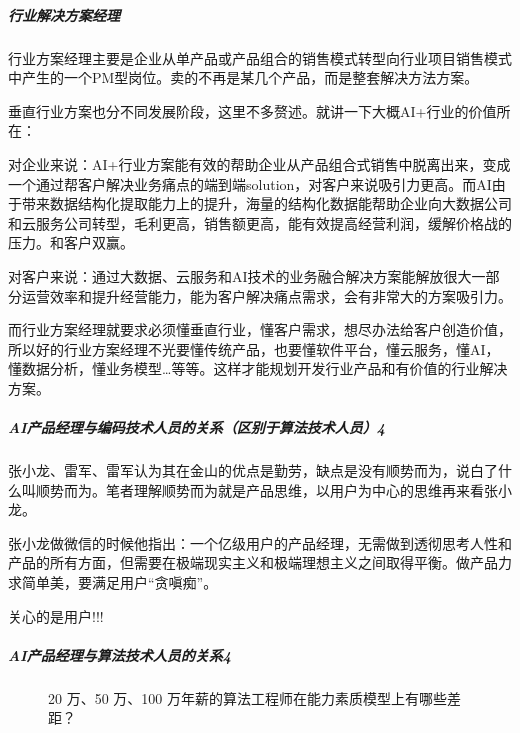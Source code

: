 \documentclass[letterpaper,10pt,english]{sphinxmanual}
\begin{document}
\subparagraph{行业解决方案经理}
\label{\detokenize{chapter_introduction/AI_PM:id16}}
行业方案经理主要是企业从单产品或产品组合的销售模式转型向行业项目销售模式中产生的一个PM型岗位。卖的不再是某几个产品，而是整套解决方法方案。

垂直行业方案也分不同发展阶段，这里不多赘述。就讲一下大概AI+行业的价值所在：

对企业来说：AI+行业方案能有效的帮助企业从产品组合式销售中脱离出来，变成一个通过帮客户解决业务痛点的端到端solution，对客户来说吸引力更高。而AI由于带来数据结构化提取能力上的提升，海量的结构化数据能帮助企业向大数据公司和云服务公司转型，毛利更高，销售额更高，能有效提高经营利润，缓解价格战的压力。和客户双赢。

对客户来说：通过大数据、云服务和AI技术的业务融合解决方案能解放很大一部分运营效率和提升经营能力，能为客户解决痛点需求，会有非常大的方案吸引力。

而行业方案经理就要求必须懂垂直行业，懂客户需求，想尽办法给客户创造价值，所以好的行业方案经理不光要懂传统产品，也要懂软件平台，懂云服务，懂AI，懂数据分析，懂业务模型…等等。这样才能规划开发行业产品和有价值的行业解决方案。


\subparagraph{AI产品经理与编码技术人员的关系（区别于算法技术人员）4\sphinxfootnotemark[285]}
\label{\detokenize{chapter_introduction/AI_PM:ai-4}}%
\begin{footnotetext}[285]\sphinxAtStartFootnote
{}
%
\end{footnotetext}\ignorespaces 
张小龙、雷军、雷军认为其在金山的优点是勤劳，缺点是没有顺势而为，说白了什么叫顺势而为。笔者理解顺势而为就是产品思维，以用户为中心的思维再来看张小龙。

张小龙做微信的时候他指出：一个亿级用户的产品经理，无需做到透彻思考人性和产品的所有方面，但需要在极端现实主义和极端理想主义之间取得平衡。做产品力求简单美，要满足用户“贪嗔痴”。

关心的是用户!!!


\subparagraph{AI产品经理与算法技术人员的关系4\sphinxfootnotemark[286]}
\label{\detokenize{chapter_introduction/AI_PM:ai4}}%
\begin{footnotetext}[286]\sphinxAtStartFootnote
{}
%
\end{footnotetext}\ignorespaces 
\begin{figure}[H]
\centering
\capstart

\noindent{}
\caption{20 万、50 万、100 万年薪的算法工程师在能力素质模型上有哪些差距？}\label{\detokenize{chapter_introduction/AI_PM:id58}}\end{figure}
\end{document}
